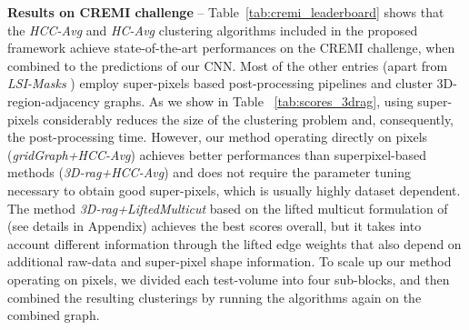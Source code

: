 \textbf{Results on CREMI challenge} -- 
Table~\ref{tab:cremi_leaderboard} shows that the \emph{HCC-Avg} and \emph{HC-Avg} clustering algorithms included in the proposed \algname{} framework achieve state-of-the-art performances on the CREMI challenge, when combined to the predictions of our CNN.
Most of the other entries (apart from \emph{LSI-Masks} \cite{bailoni2020proposal}) employ super-pixels based post-processing pipelines and cluster 3D-region-adjacency graphs. As we show in Table ~\ref{tab:scores_3drag}, using super-pixels considerably reduces the size of the clustering problem and, consequently, the post-processing time. 
However, our method operating directly on pixels (\emph{gridGraph+HCC-Avg}) achieves better performances than superpixel-based methods (\emph{3D-rag+HCC-Avg}) and does not require the parameter tuning necessary to obtain good super-pixels, which is usually highly dataset dependent.
The method \emph{3D-rag+LiftedMulticut} based on the lifted multicut formulation of \cite{beier2017multicut} (see details in Appendix) achieves the best scores overall, but it takes into account different information through the lifted edge weights that also depend on additional raw-data and super-pixel shape information. 
To scale up our method operating on pixels, we divided each test-volume into four sub-blocks, and then combined the resulting clusterings by running the algorithms again on the combined graph.





